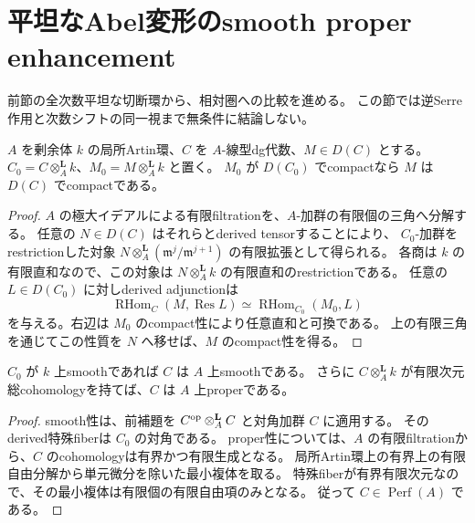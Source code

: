\section{平坦なAbel変形のsmooth proper enhancement}
\label{sec:artin-enhancement}
前節の全次数平坦な切断環から、相対圏への比較を進める。
この節では逆Serre作用と次数シフトの同一視まで無条件に結論しない。

\begin{lemma}[nilpotent底上のcompact性の持上げ]\label{lem:dg-compact-lift}
$A$ を剰余体 $k$ の局所Artin環、$C$ を $A$-線型dg代数、$M\in D(C)$ とする。
$C_0=C\otimes_A^{\mathbf L}k$、$M_0=M\otimes_A^{\mathbf L}k$ と置く。
$M_0$ が $D(C_0)$ でcompactなら $M$ は $D(C)$ でcompactである。
\end{lemma}
\begin{proof}
$A$ の極大イデアルによる有限filtrationを、$A$-加群の有限個の三角へ分解する。
任意の $N\in D(C)$ はそれらとderived tensorすることにより、
$C_0$-加群をrestrictionした対象
$N\otimes_A^{\mathbf L}(\mathfrak m^j/\mathfrak m^{j+1})$ の有限拡張として得られる。
各商は $k$ の有限直和なので、この対象は
$N\otimes_A^{\mathbf L}k$ の有限直和のrestrictionである。
任意の $L\in D(C_0)$ に対しderived adjunctionは
\[
 \operatorname{RHom}_C(M,\operatorname{Res}L)
  \simeq\operatorname{RHom}_{C_0}(M_0,L)
\]
を与える。右辺は $M_0$ のcompact性により任意直和と可換である。
上の有限三角を通じてこの性質を $N$ へ移せば、$M$ のcompact性を得る。
\end{proof}

\begin{corollary}[smooth性のArtin持上げ]\label{cor:dg-smooth-lift}
$C_0$ が $k$ 上smoothであれば $C$ は $A$ 上smoothである。
さらに $C\otimes_A^{\mathbf L}k$ が有限次元総cohomologyを持てば、$C$ は $A$ 上properである。
\end{corollary}
\begin{proof}
smooth性は、前補題を $C^{\rm op}\otimes_A^{\mathbf L}C$ と対角加群 $C$ に適用する。
そのderived特殊fiberは $C_0$ の対角である。
proper性については、$A$ の有限filtrationから、$C$ のcohomologyは有界かつ有限生成となる。
局所Artin環上の有界上の有限自由分解から単元微分を除いた最小複体を取る。
特殊fiberが有界有限次元なので、その最小複体は有限個の有限自由項のみとなる。
従って $C\in\operatorname{Perf}(A)$ である。
\end{proof}

